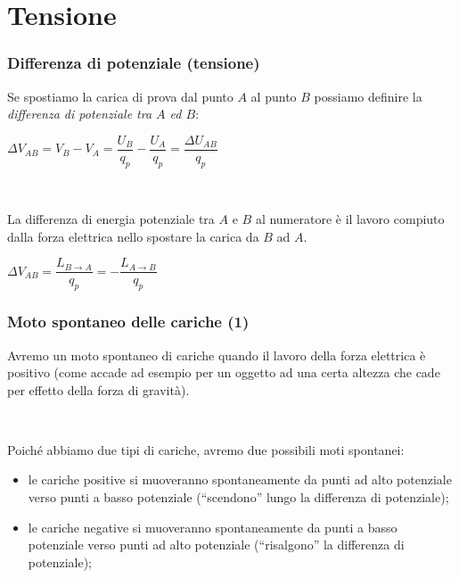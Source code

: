 \documentclass[]{beamer}
\theoremstyle{plain}
\begin{document}
\section{Tensione}

\begin{frame}
\frametitle{Differenza di potenziale (tensione)}

Se spostiamo la carica di prova dal punto $ A $ al punto $ B $ possiamo definire la \emph{differenza di potenziale tra $ A $ ed $ B $}:
\begin{center}
$ \Delta V_{AB} = V_B - V_A = \dfrac{U_B}{q_p} - \dfrac{U_A}{q_p} = \dfrac{\Delta U_{AB}}{q_p}$
\end{center}\pause

~

\alert{La differenza di energia potenziale} tra $ A $ e $ B $ al numeratore \alert{è il lavoro compiuto dalla forza elettrica} nello spostare la carica da $ B $ ad $ A $.
\begin{center}
\colorbox{blue!30}{$ \Delta V_{AB} = \dfrac{L_{B \to A}}{q_p} = -\dfrac{L_{A \to B}}{q_p} $}
\end{center}
\end{frame}


\begin{frame}
\frametitle{Moto spontaneo delle cariche (1)}
Avremo un moto spontaneo di cariche quando il lavoro della forza elettrica è positivo (come accade ad esempio per un oggetto ad una certa altezza che cade per effetto della forza di gravità).\pause

~

Poiché abbiamo due tipi di cariche, avremo due possibili moti spontanei:
\begin{itemize}
  \item \alert<2>{le cariche positive} si muoveranno spontaneamente da punti ad alto potenziale verso punti a basso potenziale (\alert<2>{``scendono'' lungo la differenza di potenziale});\pause
  \item \alert<3>{le cariche negative} si muoveranno spontaneamente da punti a basso potenziale verso punti ad alto potenziale (\alert<3>{``risalgono'' la differenza di potenziale});
\end{itemize}
\end{frame}
\end{document}
